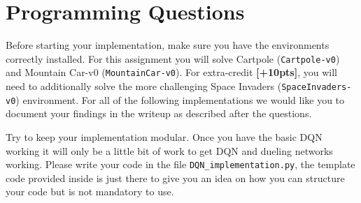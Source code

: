 \documentclass[12pt]{article}
\begin{document}
\noindent

\begin{solution}
\end{solution}


\section{Programming Questions}
Before starting your implementation, make sure you have the environments correctly installed.
For this assignment you will solve Cartpole (\texttt{Cartpole-v0}) and Mountain Car-v0 (\texttt{MountainCar-v0}). For extra-credit \textbf{[+10pts]}, you will need to additionally solve the more challenging Space Invaders (\texttt{SpaceInvaders-v0}) environment. For all of the following implementations we would like you to document your findings in the writeup as described after the questions.

Try to keep your implementation modular. Once you have the basic DQN working it will only be a little bit of work to get DQN and dueling networks working. Please write your code in the file \texttt{DQN\_implementation.py}, the template code provided inside is just there to give you an idea on how you can structure your code but is not mandatory to use.
\end{document}

